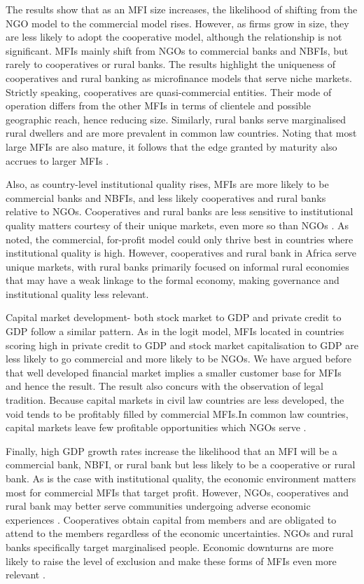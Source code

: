 \documentclass[a4paper,nobind]{templates/ociamthesis}
\begin{document}
The results show that as an MFI size increases, the likelihood of shifting from the NGO model to the commercial model rises. However, as firms grow in size, they are less likely to adopt the cooperative model, although the relationship is not significant. MFIs mainly shift from NGOs to commercial banks and NBFIs, but rarely to cooperatives or rural banks. The results highlight the uniqueness of cooperatives and rural banking as microfinance models that serve niche markets. Strictly speaking, cooperatives are quasi-commercial entities. Their mode of operation differs from the other MFIs in terms of clientele and possible geographic reach, hence reducing size. Similarly, rural banks serve marginalised rural dwellers and are more prevalent in common law countries. Noting that most large MFIs are also mature, it follows that the edge granted by maturity also accrues to larger MFIs \autocite{beck2014sme,kersten2017small}.

Also, as country-level institutional quality rises, MFIs are more likely to be commercial banks and NBFIs, and less likely cooperatives and rural banks relative to NGOs. Cooperatives and rural banks are less sensitive to institutional quality matters courtesy of their unique markets, even more so than NGOs \autocite{sobel2008testing}. As noted, the commercial, for-profit model could only thrive best in countries where institutional quality is high. However, cooperatives and rural bank in Africa serve unique markets, with rural banks primarily focused on informal rural economies that may have a weak linkage to the formal economy, making governance and institutional quality less relevant.

Capital market development- both stock market to GDP and private credit to GDP follow a similar pattern. As in the logit model, MFIs located in countries scoring high in private credit to GDP and stock market capitalisation to GDP are less likely to go commercial and more likely to be NGOs. We have argued before that well developed financial market implies a smaller customer base for MFIs and hence the result. The result also concurs with the observation of legal tradition. Because capital markets in civil law countries are less developed, the void tends to be profitably filled by commercial MFIs.In common law countries, capital markets leave few profitable opportunities which NGOs serve \autocite{d2013unsubsidized,armendariz2013subsidy}.

Finally, high GDP growth rates increase the likelihood that an MFI will be a commercial bank, NBFI, or rural bank but less likely to be a cooperative or rural bank. As is the case with institutional quality, the economic environment matters most for commercial MFIs that target profit. However, NGOs, cooperatives and rural bank may better serve communities undergoing adverse economic experiences \autocite{ghosh2013microfinance}. Cooperatives obtain capital from members and are obligated to attend to the members regardless of the economic uncertainties. NGOs and rural banks specifically target marginalised people. Economic downturns are more likely to raise the level of exclusion and make these forms of MFIs even more relevant \autocite{schnyder2018twenty}.
\end{document}
